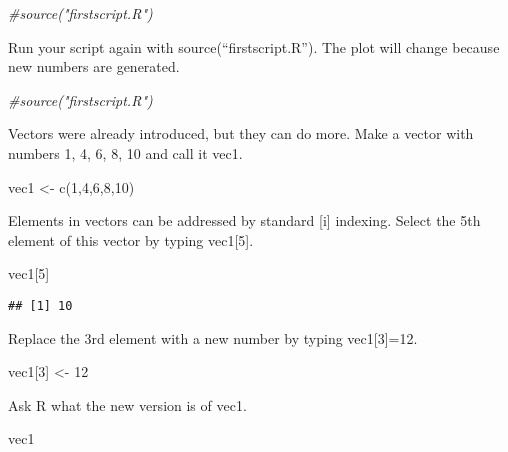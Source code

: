 \documentclass[
]{article}
\newenvironment{Shaded}{\begin{snugshade}}{\end{snugshade}}
\newcommand{\CommentTok}[1]{\textcolor[rgb]{0.56,0.35,0.01}{\textit{#1}}}
\newcommand{\DecValTok}[1]{\textcolor[rgb]{0.00,0.00,0.81}{#1}}
\newcommand{\FunctionTok}[1]{\textcolor[rgb]{0.00,0.00,0.00}{#1}}
\newcommand{\NormalTok}[1]{#1}
\newcommand{\OtherTok}[1]{\textcolor[rgb]{0.56,0.35,0.01}{#1}}
\begin{document}
\begin{Shaded}
\begin{Highlighting}[]
\CommentTok{\#source("firstscript.R")}
\end{Highlighting}
\end{Shaded}

Run your script again with source(``firstscript.R''). The plot will
change because new numbers are generated.

\begin{Shaded}
\begin{Highlighting}[]
\CommentTok{\#source("firstscript.R")}
\end{Highlighting}
\end{Shaded}

Vectors were already introduced, but they can do more. Make a vector
with numbers 1, 4, 6, 8, 10 and call it vec1.

\begin{Shaded}
\begin{Highlighting}[]
\NormalTok{vec1 }\OtherTok{\textless{}{-}} \FunctionTok{c}\NormalTok{(}\DecValTok{1}\NormalTok{,}\DecValTok{4}\NormalTok{,}\DecValTok{6}\NormalTok{,}\DecValTok{8}\NormalTok{,}\DecValTok{10}\NormalTok{)}
\end{Highlighting}
\end{Shaded}

Elements in vectors can be addressed by standard {[}i{]} indexing.
Select the 5th element of this vector by typing vec1{[}5{]}.

\begin{Shaded}
\begin{Highlighting}[]
\NormalTok{vec1[}\DecValTok{5}\NormalTok{]}
\end{Highlighting}
\end{Shaded}

\begin{verbatim}
## [1] 10
\end{verbatim}

Replace the 3rd element with a new number by typing vec1{[}3{]}=12.

\begin{Shaded}
\begin{Highlighting}[]
\NormalTok{vec1[}\DecValTok{3}\NormalTok{] }\OtherTok{\textless{}{-}} \DecValTok{12}
\end{Highlighting}
\end{Shaded}

Ask R what the new version is of vec1.

\begin{Shaded}
\begin{Highlighting}[]
\NormalTok{vec1}
\end{Highlighting}
\end{Shaded}
\end{document}
